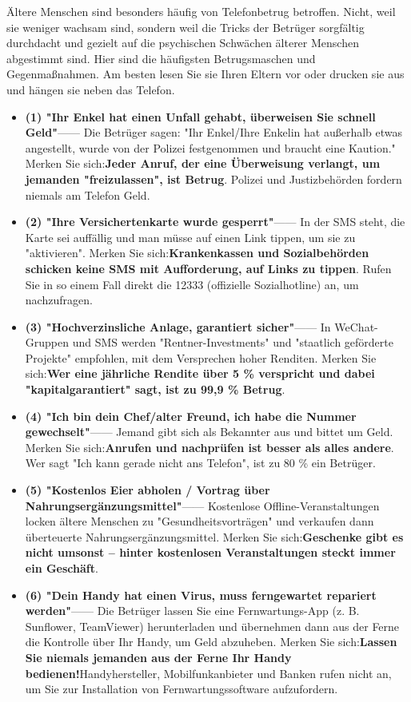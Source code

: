 
Ältere Menschen sind besonders häufig von Telefonbetrug betroffen. Nicht, weil sie weniger wachsam sind, sondern weil die Tricks der Betrüger sorgfältig durchdacht und gezielt auf die psychischen Schwächen älterer Menschen abgestimmt sind. Hier sind die häufigsten Betrugsmaschen und Gegenmaßnahmen. Am besten lesen Sie sie Ihren Eltern vor oder drucken sie aus und hängen sie neben das Telefon.


\begin{itemize}
  \item \textbf{(1) "Ihr Enkel hat einen Unfall gehabt, überweisen Sie schnell Geld"}—— Die Betrüger sagen: "Ihr Enkel/Ihre Enkelin hat außerhalb etwas angestellt, wurde von der Polizei festgenommen und braucht eine Kaution." Merken Sie sich:\textbf{Jeder Anruf, der eine Überweisung verlangt, um jemanden "freizulassen", ist Betrug}. Polizei und Justizbehörden fordern niemals am Telefon Geld.
  \item \textbf{(2) "Ihre Versichertenkarte wurde gesperrt"}—— In der SMS steht, die Karte sei auffällig und man müsse auf einen Link tippen, um sie zu "aktivieren". Merken Sie sich:\textbf{Krankenkassen und Sozialbehörden schicken keine SMS mit Aufforderung, auf Links zu tippen}. Rufen Sie in so einem Fall direkt die 12333 (offizielle Sozialhotline) an, um nachzufragen.
  \item \textbf{(3) "Hochverzinsliche Anlage, garantiert sicher"}—— In WeChat-Gruppen und SMS werden "Rentner-Investments" und "staatlich geförderte Projekte" empfohlen, mit dem Versprechen hoher Renditen. Merken Sie sich:\textbf{Wer eine jährliche Rendite über 5 \% verspricht und dabei "kapitalgarantiert" sagt, ist zu 99,9 \% Betrug}.
  \item \textbf{(4) "Ich bin dein Chef/alter Freund, ich habe die Nummer gewechselt"}—— Jemand gibt sich als Bekannter aus und bittet um Geld. Merken Sie sich:\textbf{Anrufen und nachprüfen ist besser als alles andere}. Wer sagt "Ich kann gerade nicht ans Telefon", ist zu 80 \% ein Betrüger.
  \item \textbf{(5) "Kostenlos Eier abholen / Vortrag über Nahrungsergänzungsmittel"}—— Kostenlose Offline-Veranstaltungen locken ältere Menschen zu "Gesundheitsvorträgen" und verkaufen dann überteuerte Nahrungsergänzungsmittel. Merken Sie sich:\textbf{Geschenke gibt es nicht umsonst – hinter kostenlosen Veranstaltungen steckt immer ein Geschäft}.
  \item \textbf{(6) "Dein Handy hat einen Virus, muss ferngewartet repariert werden"}—— Die Betrüger lassen Sie eine Fernwartungs-App (z. B. Sunflower, TeamViewer) herunterladen und übernehmen dann aus der Ferne die Kontrolle über Ihr Handy, um Geld abzuheben. Merken Sie sich:\textbf{Lassen Sie niemals jemanden aus der Ferne Ihr Handy bedienen!}Handyhersteller, Mobilfunkanbieter und Banken rufen nicht an, um Sie zur Installation von Fernwartungssoftware aufzufordern.
\end{itemize}

